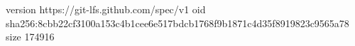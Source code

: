 version https://git-lfs.github.com/spec/v1
oid sha256:8cbb22cf3100a153c4b1cee6e517bdcb1768f9b1871c4d35f8919823c9565a78
size 174916
